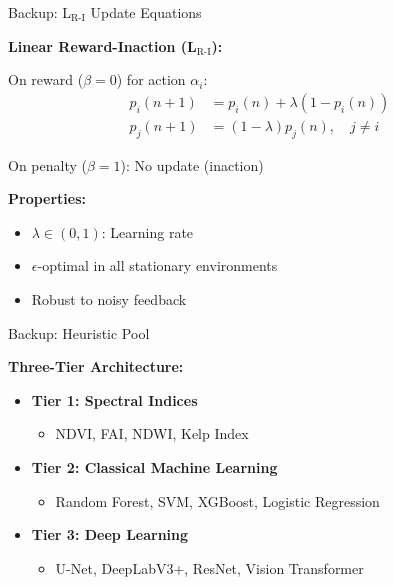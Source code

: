 \documentclass[10pt,xcolor={table,dvipsnames}]{beamer}
\begin{document}
\begin{frame}{Backup: L$_{\text{R-I}}$ Update Equations}

\textbf{Linear Reward-Inaction (L$_{\text{R-I}}$):}

On reward ($\beta = 0$) for action $\alpha_i$:
\begin{align}
p_i(n+1) &= p_i(n) + \lambda(1 - p_i(n)) \\
p_j(n+1) &= (1-\lambda)p_j(n), \quad j \neq i
\end{align}

On penalty ($\beta = 1$): No update (inaction)

\vspace{0.5em}
\textbf{Properties:}
\begin{itemize}
  \item $\lambda \in (0,1)$: Learning rate
  \item $\epsilon$-optimal in all stationary environments
  \item Robust to noisy feedback
\end{itemize}

\end{frame}

\begin{frame}{Backup: Heuristic Pool}

\textbf{Three-Tier Architecture:}

\begin{itemize}
  \item \textbf{Tier 1: Spectral Indices}
  \begin{itemize}
    \item NDVI, FAI, NDWI, Kelp Index
  \end{itemize}

  \item \textbf{Tier 2: Classical Machine Learning}
  \begin{itemize}
    \item Random Forest, SVM, XGBoost, Logistic Regression
  \end{itemize}

  \item \textbf{Tier 3: Deep Learning}
  \begin{itemize}
    \item U-Net, DeepLabV3+, ResNet, Vision Transformer
  \end{itemize}
\end{itemize}

\end{frame}
\end{document}
